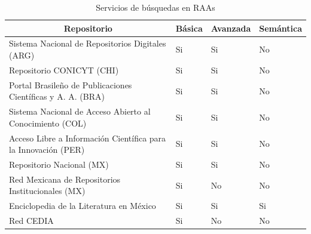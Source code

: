 
\begin{table}[htbp]
\caption{Servicios de b\'usquedas en RAAs}
\begin{tabular}{| p{8.5cm}| p{1.5cm} | p{2cm} | p{2cm} |}
\hline
\multicolumn{1}{|c|}{\textbf{Repositorio}}                     & \textbf{B\'asica} & \textbf{Avanzada} & \textbf{Sem\'antica} \\ \hline
Sistema Nacional de  Repositorios Digitales (ARG)              & Si              & Si                & No                 \\ \hline
Repositorio CONICYT (CHI)                                      & Si              & Si                & No                 \\ \hline
Portal Brasileño de  Publicaciones Cient\'ificas y  A. A. (BRA)  & Si              & Si                & No                 \\ \hline
Sistema Nacional de  Acceso Abierto al Conocimiento (COL)      & Si              & Si                & No                 \\ \hline
Acceso Libre a Informaci\'on Cient\'ifica para la Innovaci\'on (PER) & Si              & Si                & No                 \\ \hline
Repositorio Nacional (MX)                                      & Si              & Si                & No                 \\ \hline
Red Mexicana de  Repositorios Institucionales (MX)             & Si              & No                & No                 \\ \hline
Enciclopedia de la Literatura en M\'exico                        & Si              & Si                & Si                 \\ \hline
Red CEDIA                                                      & Si              & No                & No                 \\ \hline
\end{tabular}
\label{estadisticas-raas}
\end{table}



